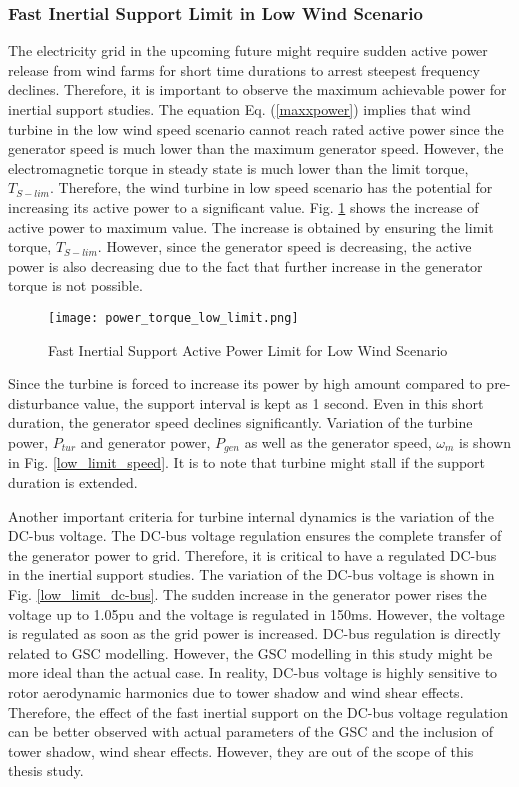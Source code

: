 \subsubsection{Fast Inertial Support Limit in Low Wind Scenario}
The electricity grid in the upcoming future might require sudden active power release from wind farms for short time durations to arrest steepest frequency declines. Therefore, it is important to observe the maximum achievable power for inertial support studies. The equation Eq. (\ref{maxxpower}) implies that wind turbine in the low wind speed scenario cannot reach rated active power since the generator speed is much lower than the maximum generator speed. However, the electromagnetic torque in steady state is much lower than the limit torque, $T_{S-lim}$. Therefore, the wind turbine in low speed scenario has the potential for increasing its active power to a significant value. Fig. \ref{low_limit_power} shows the increase of active power to maximum value. The increase is obtained by ensuring the limit torque, $T_{S-lim}$. However, since the generator speed is decreasing, the active power is also decreasing due to the fact that further increase in the generator torque is not possible. \par
\begin{figure}[h]
	\centering
	\texttt{[image: power\_torque\_low\_limit.png]}
	\caption{Fast Inertial Support Active Power Limit for Low Wind Scenario}
	\label{low_limit_power}
\end{figure}
Since the turbine is forced to increase its power by high amount compared to pre-disturbance value, the support interval is kept as 1 second. Even in this short duration, the generator speed declines significantly. Variation of the turbine power, $P_{tur}$ and generator power, $P_{gen}$ as well as the generator speed, $\omega_{m}$ is shown in Fig. \ref{low_limit_speed}. It is to note that turbine might stall if the support duration is extended. \par
Another important criteria for turbine internal dynamics is the variation of the DC-bus voltage. The DC-bus voltage regulation ensures the complete transfer of the generator power to grid. Therefore, it is critical to have a regulated DC-bus in the inertial support studies. The variation of the DC-bus voltage is shown in Fig. \ref{low_limit_dc-bus}. The sudden increase in the generator power rises the voltage up to 1.05pu and the voltage is regulated in 150ms. However, the voltage is regulated as soon as the grid power is increased. DC-bus regulation is directly related to GSC modelling. However, the GSC modelling in this study might be more ideal than the actual case. In reality, DC-bus voltage is highly sensitive to rotor aerodynamic harmonics due to tower shadow and wind shear effects\cite{Papathanassiou}. Therefore, the effect of the fast inertial support on the DC-bus voltage regulation can be better observed with actual parameters of the GSC and the inclusion of tower shadow, wind shear effects. However, they are out of the scope of this thesis study.
